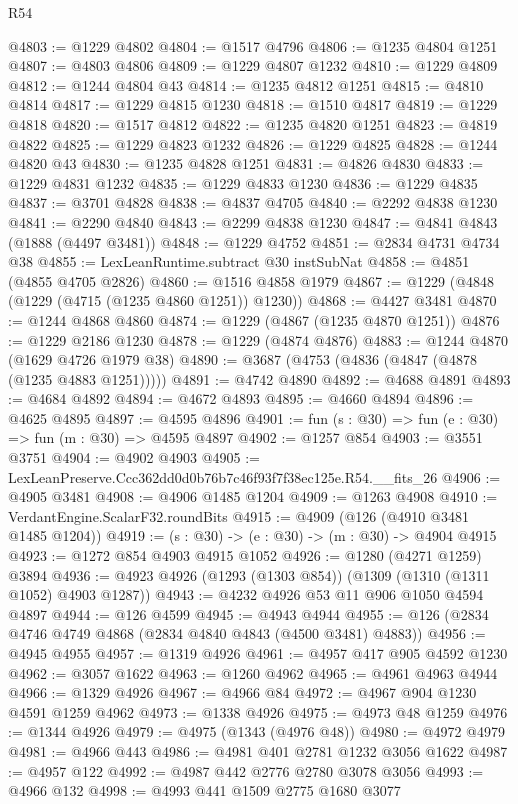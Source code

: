 \begin{lexlean}{R54}
\begin{coremodule}
@4803 := @1229 @4802
@4804 := @1517 @4796
@4806 := @1235 @4804 @1251
@4807 := @4803 @4806
@4809 := @1229 @4807 @1232
@4810 := @1229 @4809
@4812 := @1244 @4804 @43
@4814 := @1235 @4812 @1251
@4815 := @4810 @4814
@4817 := @1229 @4815 @1230
@4818 := @1510 @4817
@4819 := @1229 @4818
@4820 := @1517 @4812
@4822 := @1235 @4820 @1251
@4823 := @4819 @4822
@4825 := @1229 @4823 @1232
@4826 := @1229 @4825
@4828 := @1244 @4820 @43
@4830 := @1235 @4828 @1251
@4831 := @4826 @4830
@4833 := @1229 @4831 @1232
@4835 := @1229 @4833 @1230
@4836 := @1229 @4835
@4837 := @3701 @4828
@4838 := @4837 @4705
@4840 := @2292 @4838 @1230
@4841 := @2290 @4840
@4843 := @2299 @4838 @1230
@4847 := @4841 @4843 (@1888 (@4497 @3481))
@4848 := @1229 @4752
@4851 := @2834 @4731 @4734 @38
@4855 := LexLeanRuntime.subtract @30 instSubNat
@4858 := @4851 (@4855 @4705 @2826)
@4860 := @1516 @4858 @1979
@4867 := @1229 (@4848 (@1229 (@4715 (@1235 @4860 @1251)) @1230))
@4868 := @4427 @3481
@4870 := @1244 @4868 @4860
@4874 := @1229 (@4867 (@1235 @4870 @1251))
@4876 := @1229 @2186 @1230
@4878 := @1229 (@4874 @4876)
@4883 := @1244 @4870 (@1629 @4726 @1979 @38)
@4890 := @3687 (@4753 (@4836 (@4847 (@4878 (@1235 @4883 @1251)))))
@4891 := @4742 @4890
@4892 := @4688 @4891
@4893 := @4684 @4892
@4894 := @4672 @4893
@4895 := @4660 @4894
@4896 := @4625 @4895
@4897 := @4595 @4896
@4901 := fun (s : @30) => fun (e : @30) => fun (m : @30) => @4595 @4897
@4902 := @1257 @854
@4903 := @3551 @3751
@4904 := @4902 @4903
@4905 := LexLeanPreserve.Ccc362dd0d0b76b7c46f93f7f38ec125e.R54.__fits_26
@4906 := @4905 @3481
@4908 := @4906 @1485 @1204
@4909 := @1263 @4908
@4910 := VerdantEngine.ScalarF32.roundBits
@4915 := @4909 (@126 (@4910 @3481 @1485 @1204))
@4919 := (s : @30) -> (e : @30) -> (m : @30) -> @4904 @4915
@4923 := @1272 @854 @4903 @4915 @1052
@4926 := @1280 (@4271 @1259) @3894
@4936 := @4923 @4926 (@1293 (@1303 @854)) (@1309 (@1310 (@1311 @1052) @4903 @1287))
@4943 := @4232 @4926 @53 @11 @906 @1050 @4594 @4897
@4944 := @126 @4599
@4945 := @4943 @4944
@4955 := @126 (@2834 @4746 @4749 @4868 (@2834 @4840 @4843 (@4500 @3481) @4883))
@4956 := @4945 @4955
@4957 := @1319 @4926
@4961 := @4957 @417 @905 @4592 @1230
@4962 := @3057 @1622
@4963 := @1260 @4962
@4965 := @4961 @4963 @4944
@4966 := @1329 @4926
@4967 := @4966 @84
@4972 := @4967 @904 @1230 @4591 @1259 @4962
@4973 := @1338 @4926
@4975 := @4973 @48 @1259
@4976 := @1344 @4926
@4979 := @4975 (@1343 (@4976 @48))
@4980 := @4972 @4979
@4981 := @4966 @443
@4986 := @4981 @401 @2781 @1232 @3056 @1622
@4987 := @4957 @122
@4992 := @4987 @442 @2776 @2780 @3078 @3056
@4993 := @4966 @132
@4998 := @4993 @441 @1509 @2775 @1680 @3077

\end{coremodule}
\end{lexlean}
